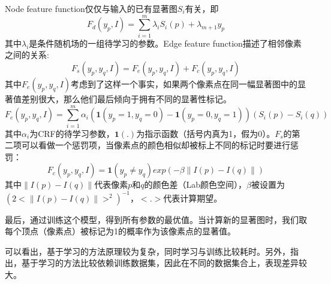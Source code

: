 Node feature function仅仅与输入的已有显著图$S_i$有关，即
\begin{equation}
F_d(y_p, I) = \sum_{i=1}^{m} \lambda_iS_i(p) + \lambda_{m+1}y_p
\end{equation}
其中$\lambda_i$是条件随机场的一组待学习的参数。Edge feature function描述了相邻像素之间的关系:
\begin{equation}
F_s(y_p,y_q,I) = F_e(y_p,y_q,I) + F_c(y_p,y_q,I)
\end{equation}
其中$F_e(y_p,y_q,I)$考虑到了这样一个事实，如果两个像素点在同一幅显著图中的显著值差别很大，那么他们最后倾向于拥有不同的显著性标记。
\begin{equation}
  F_e(y_p,y_q,I) = \sum_{i=1}^{m}\alpha_i(\textbf{1}(y_p=1,y_q=0)-\textbf{1}(y_p=0,y_q=1))(S_i(p)-S_i(q))
\end{equation}
其中$\alpha_i$为CRF的待学习参数，$\textbf{1}(.)$为指示函数（括号内真为1，假为0）。$F_s$的第二项可以看做一个惩罚项，当像素点的颜色相似却被标上不同的标记时要进行惩罚：
\begin{equation}
F_c(y_p,y_q,I)=\textbf{1}(y_p \not= y_q) exp(-\beta \parallel I(p)-I(q) \parallel )
\end{equation}
其中$\parallel I(p)-I(q) \parallel$代表像素$p$和$q$的颜色差（Lab颜色空间），$\beta$被设置为$(2<\parallel I(p)-I(q) \parallel>^2)^{-1}$，$<.>$代表计算期望。

最后，通过训练这个模型，得到所有参数的最优值。当计算新的显著图时，我们取每个顶点（像素点）被标记为1的概率作为该像素点的显著值。

可以看出，基于学习的方法原理较为复杂，同时学习与训练比较耗时。另外，\citep{liu2011learning}指出，基于学习的方法比较依赖训练数据集，因此在不同的数据集合上，表现差异较大。

